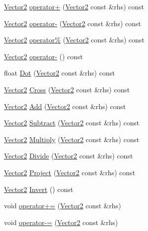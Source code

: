 \begin{DoxyCompactItemize}
\item 
\hyperlink{structVector2}{Vector2} \hyperlink{structVector2_a7948865cb48cada5d28b32ea9c44346f}{operator+} (\hyperlink{structVector2}{Vector2} const \&rhs) const 
\item 
\hyperlink{structVector2}{Vector2} \hyperlink{structVector2_a47d40aebac7d2673e4e6b2b95858b240}{operator-\/} (\hyperlink{structVector2}{Vector2} const \&rhs) const 
\item 
\hyperlink{structVector2}{Vector2} \hyperlink{structVector2_a472c1fbf02ae95fc3f3a728343c29837}{operator\%} (\hyperlink{structVector2}{Vector2} const \&rhs) const 
\item 
\hyperlink{structVector2}{Vector2} \hyperlink{structVector2_a5f5eb2d81dd299366ca228963ae76fa0}{operator-\/} () const 
\item 
float \hyperlink{structVector2_abe020034445097a6380444dfd301100c}{Dot} (\hyperlink{structVector2}{Vector2} const \&rhs) const 
\item 
\hyperlink{structVector2}{Vector2} \hyperlink{structVector2_aafa5282e1eb56853c71e788bbbf76267}{Cross} (\hyperlink{structVector2}{Vector2} const \&rhs) const 
\item 
\hyperlink{structVector2}{Vector2} \hyperlink{structVector2_a5c3d7b6ef2790feb63cfd8766868fa7a}{Add} (\hyperlink{structVector2}{Vector2} const \&rhs) const 
\item 
\hyperlink{structVector2}{Vector2} \hyperlink{structVector2_a5ee02937cd9052a7079c7850bad44112}{Subtract} (\hyperlink{structVector2}{Vector2} const \&rhs) const 
\item 
\hyperlink{structVector2}{Vector2} \hyperlink{structVector2_a55ccb4b078cbf892790add2e97ed256b}{Multiply} (\hyperlink{structVector2}{Vector2} const \&rhs) const 
\item 
\hyperlink{structVector2}{Vector2} \hyperlink{structVector2_a141d4f3e286ab0a163acc0e33745630d}{Divide} (\hyperlink{structVector2}{Vector2} const \&rhs) const 
\item 
\hyperlink{structVector2}{Vector2} \hyperlink{structVector2_ad71bd6d85b1d71c3fb1a988a8b4c4693}{Project} (\hyperlink{structVector2}{Vector2} const \&rhs) const 
\item 
\hyperlink{structVector2}{Vector2} \hyperlink{structVector2_a8c2e5bd193e652bcf315faa19ebcd225}{Invert} () const 
\item 
void \hyperlink{structVector2_affdc1e6d897711ead3203eb42f5cf0bd}{operator+=} (\hyperlink{structVector2}{Vector2} const \&rhs)
\item 
void \hyperlink{structVector2_a54bce404c5b1a347abb8d4adaf9ecd97}{operator-\/=} (\hyperlink{structVector2}{Vector2} const \&rhs)

\end{DoxyCompactItemize}
